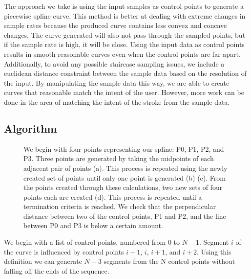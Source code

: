 The approach we take is using the input samples as control points to generate a piecewise spline curve. 
This method is better at dealing with extreme changes in sample rates because the produced curve contains less convex and concave changes. 
The curve generated will also not pass through the sampled points, but if the sample rate is high, it will be close.
Using the input data as control points results in smooth reasonable curves even when the control points are far apart.
Additionally, to avoid any possible staircase sampling issues, we include a euclidean distance constraint between the sample data based on the resolution of the input. 
By manipulating the sample data this way, we are able to create curves that reasonable match the intent of the user.
However, more work can be done in the area of matching the intent of the stroke from the sample data. 

\subsection{Algorithm}

\begin{figure}
\begin{center}
\end{center}
\caption[Creating the subdivided polyline from the control points]{We begin with four points representing our spline: P0, P1, P2, and P3. Three points are generated by taking the midpoints of each adjacent pair of points (a). This process is repeated using the newly created set of points until only one point is generated (b) (c). From the points created through these calculations, two new sets of four points each are created (d). This process is repeated until a termination criteria is reached. We check that the perpendicular distance between two of the control points, P1 and P2, and the line between P0 and P3 is below a certain amount.}
\label{fig:subdiv}
\end{figure}

We begin with a list of control points, numbered from 0 to $N-1$. 
Segment $i$ of the curve is influenced by control points $i-1$, $i$, $i+1$, and $i+2$.
Using this definition we can generate $N-3$ segments from the N control points without falling off the ends of the sequence.

